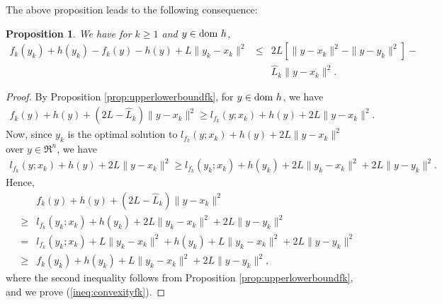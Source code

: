 \documentclass[11pt]{article}
\newtheorem{proposition}[thm]{Proposition}
\begin{document}
\vspace{10pt}

\noindent The above proposition leads to the following consequence:
\begin{proposition}\label{prop:convexityfk}
We have for $k \geq 1$ and  $y \in {\rm{dom}}\ h$,
\begin{eqnarray}
f_{k}(y_{k}) + h(y_{k}) - f_{k}(y) - h(y) + L\| y_{k} - {x}_{k} \|^2  & \leq &   2L [\| y - {x}_{k} \|^2 - \| y - y_{k} \|^2] - \nonumber \\
& &  \hat{L}_k  \| y - {x}_{k} \|^2.   \label{ineq:convexityfk}
\end{eqnarray}
\end{proposition}
\begin{proof}
By Proposition \ref{prop:upperlowerboundfk}, for $y \in {\rm{dom}}\ h$, we have
\begin{eqnarray*}
f_{k}(y) + h(y) + (2	L - \hat{L}_k) \| y - {x}_{k} \|^2 \geq l_{f_{k}}(y; x_{k}) + h(y) + 2L \| y - {x}_{k} \|^2.
\end{eqnarray*}
Now, since $y_{k}$ is the optimal solution to $l_{f_{k}}(y; x_{k}) + h(y) + 2L \| y - {x}_{k} \|^2$ over $y \in \Re^n$, we have
\begin{eqnarray*}
 l_{f_{k}}(y; x_{k}) + h(y) + 2L \| y - {x}_{k} \|^2 \geq  l_{f_{k}}(y_{k};x_{k}) + h(y_{k}) + 2L \|y_{k} - {x}_{k}\|^2 + 2L \| y - y_{k}\|^2.
\end{eqnarray*}
Hence,
\begin{eqnarray*}
&   & f_{k}(y) + h(y) + (2L - \hat{L}_k) \| y - {x}_{k} \|^2  \\
 & \geq & l_{f_{k}}(y_{k};x_{k}) + h(y_{k}) + 2L \|y_{k} - {x}_{k}\|^2 + 2L \| y - y_{k}\|^2 \\
& = & l_{f_{k}}(y_{k};x_{k}) + L \|y_{k} - x_{k} \|^2 + h(y_{k}) +  L \| y_{k} - {x}_{k} \|^2  +   2L \| y - y_{k}\|^2  \\
& \geq & f_{k}(y_{k}) + h(y_{k}) + L \| y_{k} - {x}_{k} \|^2 + 2L \| y - y_{k}\|^2,
\end{eqnarray*}
where the second inequality follows from Proposition \ref{prop:upperlowerboundfk}, and we prove (\ref{ineq:convexityfk}).
\end{proof}
\end{document}
